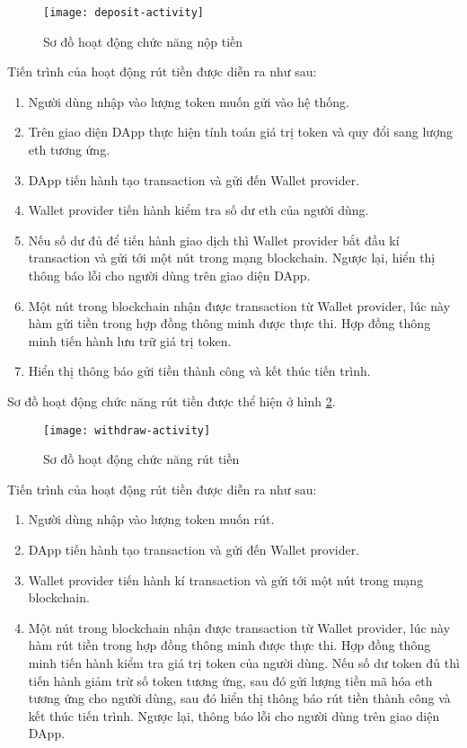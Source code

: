 \documentclass[../main-report.tex]{subfiles}
\begin{document}
\begin{figure}[ht!]
\begin{center}
\label{fig:deposit-activity}
\texttt{[image: deposit-activity]}
\caption{Sơ đồ hoạt động chức năng nộp tiền}
\end{center}
\end{figure}

Tiến trình của hoạt động rút tiền được diễn ra như sau:

\begin{enumerate}[label=(\arabic*)]
\item Người dùng nhập vào lượng token muốn gửi vào hệ thống.
\item Trên giao diện DApp thực hiện tính toán giá trị token và quy đổi sang lượng \gls{eth} tương ứng.
\item DApp tiến hành tạo \gls{transaction} và gửi đến Wallet provider.
\item Wallet provider tiến hành kiểm tra số dư \gls{eth} của người dùng.
\item Nếu số dư đủ để tiến hành giao dịch thì Wallet provider bắt đầu kí transaction và gửi tới một nút trong mạng blockchain. Ngược lại, hiển thị thông báo lỗi cho người dùng trên giao diện DApp.
\item Một nút trong blockchain nhận được transaction từ Wallet provider, lúc này hàm gửi tiền trong hợp đồng thông minh được thực thi. Hợp đồng thông minh tiến hành lưu trữ giá trị token.
\item Hiển thị thông báo gửi tiền thành công và kết thúc tiến trình.
\end{enumerate}

Sơ đồ hoạt động chức năng rút tiền được thể hiện ở hình \ref{fig:withdraw-activity}.

\begin{figure}[ht!]
\begin{center}
\label{fig:withdraw-activity}
\texttt{[image: withdraw-activity]}
\caption{Sơ đồ hoạt động chức năng rút tiền}
\end{center}
\end{figure}

Tiến trình của hoạt động rút tiền được diễn ra như sau:

\begin{enumerate}[label=(\arabic*)]
\item Người dùng nhập vào lượng token muốn rút.
\item DApp tiến hành tạo \gls{transaction} và gửi đến Wallet provider.
\item Wallet provider tiến hành kí transaction và gửi tới một nút trong mạng blockchain.
\item Một nút trong blockchain nhận được transaction từ Wallet provider, lúc này hàm rút tiền trong hợp đồng thông minh được thực thi. Hợp đồng thông minh tiến hành kiểm tra giá trị token của người dùng. Nếu số dư token đủ thì tiến hành giảm trừ số token tương ứng, sau đó gửi lượng tiền mã hóa \gls{eth} tương ứng cho người dùng, sau đó hiển thị thông báo rút tiền thành công và kết thúc tiến trình. Ngược lại, thông báo lỗi cho người dùng trên giao diện DApp.
\end{enumerate}
\end{document}
